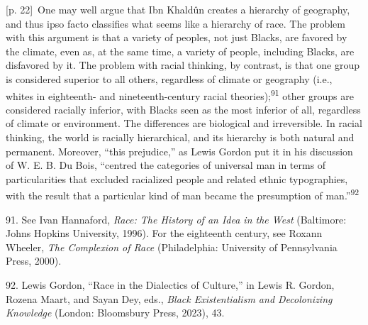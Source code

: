 \documentclass[10pt,a4paper]{article}
\begin{document}
{\scriptsize\color{gray} [p. 22]}\ One may well argue that Ibn Khaldûn creates a hierarchy of geography, and thus ipso facto classifies what seems like a hierarchy of race. The problem with this argument is that a variety of peoples, not just Blacks, are favored by the climate, even as, at the same time, a variety of people, including Blacks, are disfavored by it. The problem with racial thinking, by contrast, is that one group is considered superior to all others, regardless of climate or geography (i.e., whites in eighteenth- and nineteenth-century racial theories);\nobreak\textsuperscript{91} other groups are considered racially inferior, with Blacks seen as the most inferior of all, regardless of climate or environment. The differences are biological and irreversible. In racial thinking, the world is racially hierarchical, and its hierarchy is both natural and permanent. Moreover, “this prejudice,” as Lewis Gordon put it in his discussion of W. E. B. Du Bois, “centred the categories of universal man in terms of particularities that excluded racialized people and related ethnic typographies, with the result that a particular kind of man became the presumption of man.”\nobreak\textsuperscript{92}\par{\small 91. See Ivan Hannaford, \textit{Race: The History of an Idea in the West} (Baltimore: Johns Hopkins University, 1996). For the eighteenth century, see Roxann Wheeler, \textit{The Complexion of Race} (Philadelphia: University of Pennsylvania Press, 2000).\par}{\small 92. Lewis Gordon, “Race in the Dialectics of Culture,” in Lewis R. Gordon, Rozena Maart, and Sayan Dey, eds., \textit{Black Existentialism and Decolonizing Knowledge} (London: Bloomsbury Press, 2023), 43.\par}
\end{document}
